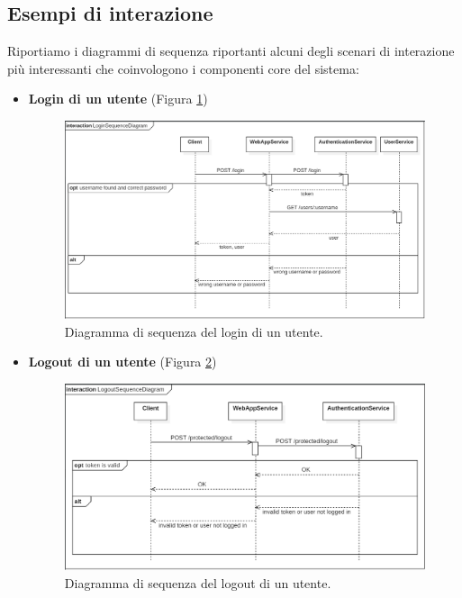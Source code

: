 \subsection{Esempi di interazione}
Riportiamo i diagrammi di sequenza riportanti alcuni degli scenari di interazione più interessanti che coinvologono i componenti core del sistema:
\begin{itemize}
    \item \textbf{Login di un utente} (Figura  \ref{fig:login-sequence-diagram})
        \begin{figure}
           \centering \includegraphics[width=\linewidth]{images/LoginSequenceDiagram.PNG}
            \caption{Diagramma di sequenza del login di un utente.}
            \label{fig:login-sequence-diagram}
        \end{figure}
        
    \item \textbf{Logout di un utente} (Figura  \ref{fig:logout-sequence-diagram})
        \begin{figure}
           \centering \includegraphics[width=\linewidth]{images/LogoutSequenceDiagram.PNG}
            \caption{Diagramma di sequenza del logout di un utente.}
            \label{fig:logout-sequence-diagram}
        \end{figure}
        

\end{itemize}
